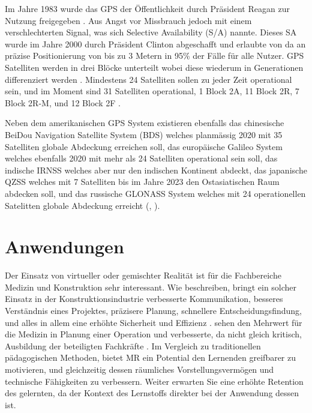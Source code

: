 \documentclass[a4paper]{scrreprt}
\begin{document}
Im Jahre 1983 wurde das GPS der Öffentlichkeit durch Präsident Reagan zur Nutzung freigegeben \parencite{Brustein2014}. Aus Angst vor Missbrauch jedoch mit einem verschlechterten Signal, was sich Selective Availability (S/A) nannte. Dieses SA wurde im Jahre 2000 durch Präsident Clinton abgeschafft und erlaubte von da an präzise Positionierung von bis zu 3 Metern in 95\% der Fälle für alle Nutzer. GPS Satelliten werden in drei Blöcke unterteilt wobei diese wiederum in Generationen differenziert werden \parencite{DoDGPS2008}. Mindestens 24 Satelliten sollen zu jeder Zeit operational sein, und im Moment sind 31 Satelliten operational, 1 Block 2A, 11 Block 2R, 7 Block 2R-M, und 12 Block 2F \parencite{NCOGPS2018}.

Neben dem amerikanischen GPS System existieren ebenfalls das chinesische BeiDou Navigation Satellite System (BDS) welches planmässig 2020 mit 35 Satelliten globale Abdeckung erreichen soll, das europäische Galileo System welches ebenfalls 2020 mit mehr als 24 Satelliten operational sein soll, das indische IRNSS welches aber nur den indischen Kontinent abdeckt, das japanische QZSS welches mit 7 Satelliten bis im Jahre 2023 den Ostasiatischen Raum abdecken soll, und das russische GLONASS System welches mit 24 operationellen Satelitten globale Abdeckung erreicht (\cite{NCOGPS2017}, \cite{IACPNTGLONASS2018}).

\section{Anwendungen}

Der Einsatz von virtueller oder gemischter Realität ist für die Fachbereiche Medizin und Konstruktion sehr interessant. Wie \citeauthor{Piroozfar2018} beschreiben, bringt ein solcher Einsatz in der Konstruktionsindustrie verbesserte Kommunikation, besseres Verständnis eines Projektes, präzisere Planung, schnellere Entscheidungsfindung, und alles in allem eine erhöhte Sicherheit und Effizienz \parencite{Piroozfar2018}. \citeauthor{Pelargos2017} sehen den Mehrwert für die Medizin in Planung einer Operation und verbesserte, da nicht gleich kritisch, Ausbildung der beteiligten Fachkräfte \parencite{Pelargos2017}. Im Vergleich zu traditionellen pädagogischen Methoden, bietet MR ein Potential den Lernenden greifbarer zu motivieren, und gleichzeitig dessen räumliches Vorstellungsvermögen und technische Fähigkeiten zu verbessern. Weiter erwarten Sie eine erhöhte Retention des gelernten, da der Kontext des Lernstoffs direkter bei der Anwendung dessen ist.
\end{document}
